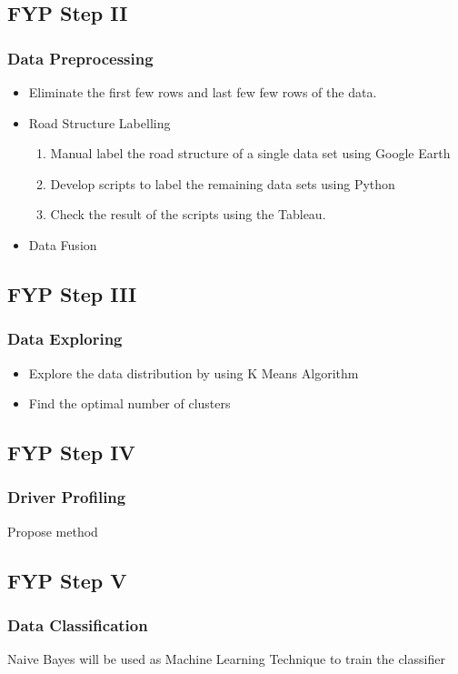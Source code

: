 \documentclass{beamer}
\begin{document}
\subsection{FYP Step II}
\begin{frame}
\frametitle{Data Preprocessing}
\begin{itemize}
\item Eliminate the first few rows and last few few rows of the data.
\item Road Structure Labelling
	\begin{enumerate}
	\item Manual label the road structure of a single data set using Google Earth
	\item Develop scripts to label the remaining data sets using Python
	\item Check the result of the scripts using the Tableau.
	\end{enumerate}

\item Data Fusion
\end{itemize}
\end{frame}

\subsection{FYP Step III}
\begin{frame}
\frametitle{Data Exploring}
\begin{itemize}
\item Explore the data distribution by using K Means Algorithm
\item Find the optimal number of clusters
\end{itemize}
\end{frame}

\subsection{FYP Step IV}
\begin{frame}
\frametitle{Driver Profiling}
Propose method
\end{frame}

\subsection{FYP Step V}
\frametitle{Data Classification}
Naive Bayes will be used as Machine Learning Technique to train the classifier
\end{document}
